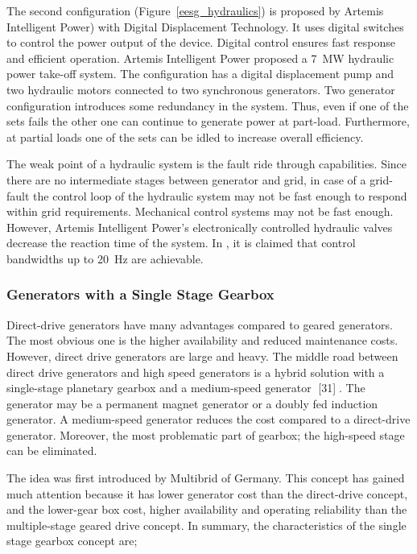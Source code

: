 \documentclass[a4paper, 11pt]{article} %
\begin{document}
The second configuration (Figure~\ref{eesg_hydraulics}) is proposed by Artemis Intelligent Power) with Digital Displacement Technology. It uses digital switches to control the power output of the device. Digital control ensures fast response and efficient operation. Artemis Intelligent Power proposed a 7~MW hydraulic power take-off system. The configuration has a digital displacement pump and two hydraulic motors connected to two synchronous generators. Two generator configuration introduces some redundancy in the system. Thus, even if one of the sets fails the other one can continue to generate power at part-load. Furthermore, at partial loads one of the sets can be idled to increase overall efficiency.

The weak point of a hydraulic system is the fault ride through capabilities. Since there are no intermediate stages between generator and grid, in case of a grid-fault the control loop of the hydraulic system may not be fast enough to respond within grid requirements. Mechanical control systems may not be fast enough. However, Artemis Intelligent Power’s electronically controlled hydraulic valves decrease the reaction time of the system. In \cite{artemis}, it is claimed that control bandwidths up to 20~Hz are achievable.

\subsubsection{Generators with a Single Stage Gearbox}

Direct-drive generators have many advantages compared to geared generators. The most obvious one is the higher availability and reduced maintenance costs. However, direct drive generators are large and heavy. The middle road between direct drive generators and high speed generators is a hybrid solution with a single-stage planetary gearbox and a medium-speed generator [31]. The generator may be a permanent magnet generator or a doubly fed induction generator. A medium-speed generator reduces the cost compared to a direct-drive generator. Moreover, the most problematic part of gearbox; the high-speed stage can be eliminated.

The idea was first introduced by Multibrid of Germany. This concept has gained much attention because it has lower generator cost than the direct-drive concept, and the lower-gear box cost, higher availability and operating reliability than the multiple-stage geared drive concept. In summary, the characteristics of the single stage gearbox concept are;
\end{document}
